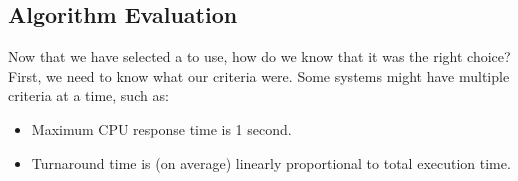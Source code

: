 \subsection{Algorithm Evaluation}\label{subsec:Algorithm_Evaluation}
Now that we have selected a  to use, how do we know that it was the right choice?
First, we need to know what our criteria were.
Some systems might have multiple criteria at a time, such as:
\begin{itemize}[noitemsep]
\item Maximum CPU response time is 1 second.
\item Turnaround time is (on average) linearly proportional to total execution time.
\end{itemize}


